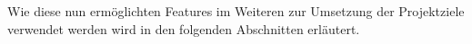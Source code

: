 \documentclass[11pt,twoside,a4paper]{article}
\begin{document}
Wie diese nun ermöglichten Features im Weiteren zur Umsetzung der Projektziele verwendet werden wird in den folgenden Abschnitten erläutert.







\newpage

\printbibliography
\newpage

\appendix



%
%

%
%
%
\end{document}
